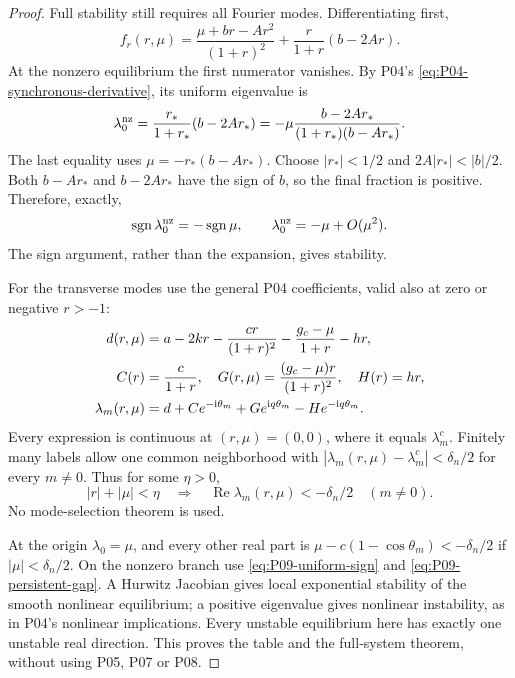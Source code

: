 \documentclass[11pt]{article}
\newcommand{\ii}{\mathrm{i}}
\DeclareMathOperator{\Ree}{Re}
\theoremstyle{definition}
\theoremstyle{remark}
\begin{document}
\begin{proof}
Full stability still requires all Fourier modes. Differentiating first,
\[
 f_r(r,\mu)=\frac{\mu+br-Ar^2}{(1+r)^2}
                  +\frac r{1+r}(b-2Ar).
\]
At the nonzero equilibrium the first numerator vanishes. By P04's
\eqref{eq:P04-synchronous-derivative}, its uniform eigenvalue is
\begin{equation}
 \lambda_0^{\rm nz}=\frac{r_*}{1+r_*}(b-2Ar_*)
 =-\mu\frac{b-2Ar_*}{(1+r_*)(b-Ar_*)}.
 \label{eq:P09-uniform-nonzero}
\end{equation}
The last equality uses $\mu=-r_*(b-Ar_*)$. Choose $|r_*|<1/2$ and
$2A|r_*|<|b|/2$. Both $b-Ar_*$ and $b-2Ar_*$ have the sign of
$b$, so the final fraction is positive. Therefore, exactly,
\begin{equation}
 \operatorname{sgn}\lambda_0^{\rm nz}=-\operatorname{sgn}\mu,
 \qquad\lambda_0^{\rm nz}=-\mu+O(\mu^2).
 \label{eq:P09-uniform-sign}
\end{equation}
The sign argument, rather than the expansion, gives stability.

For the transverse modes use the general P04 coefficients, valid also
at zero or negative $r>-1$:
\begin{align}
 d(r,\mu)&=a-2kr-\frac{cr}{(1+r)^2}-\frac{g_c-\mu}{1+r}-hr,
 \notag\\
 C(r)&=\frac c{1+r},\quad G(r,\mu)=\frac{(g_c-\mu)r}{(1+r)^2},
 \quad H(r)=hr,\notag\\
 \lambda_m(r,\mu)&=d+Ce^{-\ii\theta_m}+Ge^{\ii q\theta_m}
                                      -He^{-\ii q\theta_m}.
 \label{eq:P09-continuous-spectrum}
\end{align}
Every expression is continuous at $(r,\mu)=(0,0)$, where it equals
$\lambda_m^c$. Finitely many labels allow one common neighborhood
with $|\lambda_m(r,\mu)-\lambda_m^c|<\delta_n/2$ for every $m\ne0$.
Thus for some $\eta>0$,
\begin{equation}
 |r|+|\mu|<\eta\quad\Longrightarrow\quad
 \Ree\lambda_m(r,\mu)<-\delta_n/2\quad(m\ne0).
 \label{eq:P09-persistent-gap}
\end{equation}
No mode-selection theorem is used.

At the origin $\lambda_0=\mu$, and every other real part is
$\mu-c(1-\cos\theta_m)<-\delta_n/2$ if $|\mu|<\delta_n/2$.
On the nonzero branch use \eqref{eq:P09-uniform-sign} and
\eqref{eq:P09-persistent-gap}. A Hurwitz Jacobian gives local exponential
stability of the smooth nonlinear equilibrium; a positive eigenvalue
gives nonlinear instability, as in P04's nonlinear implications.
Every unstable equilibrium here has exactly one unstable real direction.
This proves the table and the full-system theorem, without using P05,
P07 or P08.
\end{proof}
\end{document}
